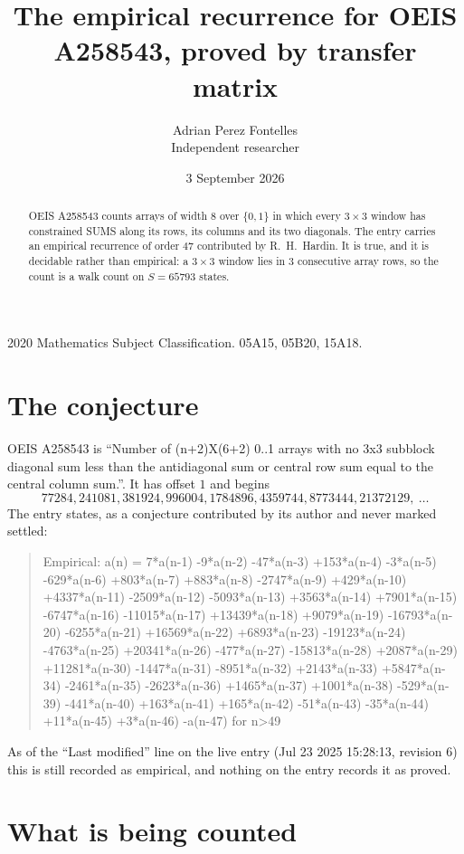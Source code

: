 \documentclass[11pt,a4paper]{article}
\title{The empirical recurrence for OEIS A258543, proved by transfer matrix}
\author{Adrian Perez Fontelles\\ \small Independent researcher}
\date{3 September 2026}
\theoremstyle{plain}
\theoremstyle{definition}
\begin{document}
\maketitle

\begin{abstract}
OEIS A258543 counts arrays of width $8$ over $\{0,1\}$ in which every $3\times3$ window has
constrained SUMS along its rows, its columns and its two diagonals. The entry carries an
empirical recurrence of order $47$ contributed by R.~H.~Hardin. It is true, and it is
decidable rather than empirical: a $3\times3$ window lies in $3$ consecutive array rows,
so the count is a walk count on $S=65793$ states.
\end{abstract}

\noindent\small 2020 Mathematics Subject Classification. 05A15, 05B20, 15A18.\normalsize

\section{The conjecture}

OEIS A258543 is ``Number of (n+2)X(6+2) 0..1 arrays with no 3x3 subblock diagonal sum less than the antidiagonal sum or central row sum equal to the central column sum.''. It has offset $1$ and begins
\[
77284, 241081, 381924, 996004, 1784896, 4359744, 8773444, 21372129,\ \dots
\]
The entry states, as a conjecture contributed by its author and never marked settled:
\begin{quote}
Empirical: a(n) = 7*a(n-1) -9*a(n-2) -47*a(n-3) +153*a(n-4) -3*a(n-5) -629*a(n-6) +803*a(n-7) +883*a(n-8) -2747*a(n-9) +429*a(n-10) +4337*a(n-11) -2509*a(n-12) -5093*a(n-13) +3563*a(n-14) +7901*a(n-15) -6747*a(n-16) -11015*a(n-17) +13439*a(n-18) +9079*a(n-19) -16793*a(n-20) -6255*a(n-21) +16569*a(n-22) +6893*a(n-23) -19123*a(n-24) -4763*a(n-25) +20341*a(n-26) -477*a(n-27) -15813*a(n-28) +2087*a(n-29) +11281*a(n-30) -1447*a(n-31) -8951*a(n-32) +2143*a(n-33) +5847*a(n-34) -2461*a(n-35) -2623*a(n-36) +1465*a(n-37) +1001*a(n-38) -529*a(n-39) -441*a(n-40) +163*a(n-41) +165*a(n-42) -51*a(n-43) -35*a(n-44) +11*a(n-45) +3*a(n-46) -a(n-47) for n>49
\end{quote}
As of the ``Last modified'' line on the live entry (Jul 23 2025 15:28:13, revision 6) this is still
recorded as empirical, and nothing on the entry records it as proved.

\section{What is being counted}
\end{document}
